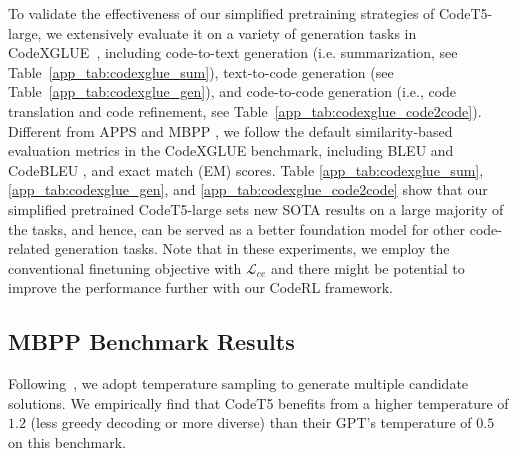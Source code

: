 \documentclass{article}
\begin{document}
To validate the effectiveness of our simplified pretraining strategies of CodeT5-large, we extensively evaluate it on a variety of generation tasks in CodeXGLUE~\citep{codexglue}, including code-to-text generation (i.e. summarization, see Table~\ref{app_tab:codexglue_sum}), text-to-code generation (see Table~\ref{app_tab:codexglue_gen}),  and code-to-code generation (i.e., code translation and code refinement, see Table~\ref{app_tab:codexglue_code2code}). 
Different from APPS \citep{hendrycksapps2021} and MBPP \citep{austin2021program}, we follow the default similarity-based evaluation metrics in the CodeXGLUE benchmark, including BLEU \citep{papineni2002bleu} and CodeBLEU \citep{ren2020codebleu}, and exact match (EM) scores. 
Table \ref{app_tab:codexglue_sum}, \ref{app_tab:codexglue_gen}, and \ref{app_tab:codexglue_code2code} show that our simplified pretrained CodeT5-large sets new SOTA results on a large majority of the tasks, and hence, can be served as a better foundation model for other code-related generation tasks.
Note that in these experiments, 
we employ the conventional finetuning objective with $\mathcal{L}_{ce}$ and there might be potential to improve the performance further with our CodeRL framework. 

\subsection{MBPP Benchmark Results}
\label{app_sec:mbpp_results}

Following~\citet{austin2021program}, we adopt temperature sampling to generate multiple candidate solutions. We empirically find that CodeT5 benefits from
a higher temperature of $1.2$ (less greedy decoding or more diverse) than their GPT's temperature of $0.5$ on this benchmark.
 
\end{document}
